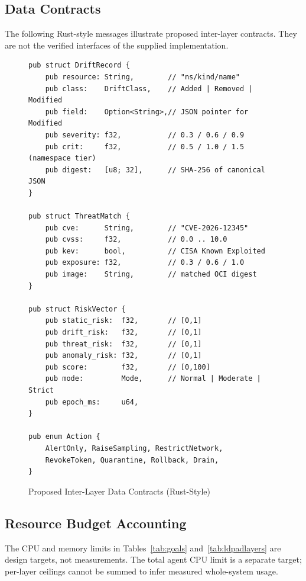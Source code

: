 \documentclass{ieeeaccess}
\begin{document}
\subsection{Data Contracts}
\label{subsec:contracts}

The following Rust-style messages illustrate proposed inter-layer contracts. They are not the verified interfaces of the supplied implementation.

\begin{figure}[t]
\caption{Proposed Inter-Layer Data Contracts (Rust-Style)}
\label{fig:contracts}
\begin{verbatim}
pub struct DriftRecord {
    pub resource: String,        // "ns/kind/name"
    pub class:    DriftClass,    // Added | Removed | Modified
    pub field:    Option<String>,// JSON pointer for Modified
    pub severity: f32,           // 0.3 / 0.6 / 0.9
    pub crit:     f32,           // 0.5 / 1.0 / 1.5 (namespace tier)
    pub digest:   [u8; 32],      // SHA-256 of canonical JSON
}

pub struct ThreatMatch {
    pub cve:      String,        // "CVE-2026-12345"
    pub cvss:     f32,           // 0.0 .. 10.0
    pub kev:      bool,          // CISA Known Exploited
    pub exposure: f32,           // 0.3 / 0.6 / 1.0
    pub image:    String,        // matched OCI digest
}

pub struct RiskVector {
    pub static_risk:  f32,       // [0,1]
    pub drift_risk:   f32,       // [0,1]
    pub threat_risk:  f32,       // [0,1]
    pub anomaly_risk: f32,       // [0,1]
    pub score:        f32,       // [0,100]
    pub mode:         Mode,      // Normal | Moderate | Strict
    pub epoch_ms:     u64,
}

pub enum Action {
    AlertOnly, RaiseSampling, RestrictNetwork,
    RevokeToken, Quarantine, Rollback, Drain,
}
\end{verbatim}
\end{figure}

\subsection{Resource Budget Accounting}
\label{subsec:budget}

The CPU and memory limits in Tables~\ref{tab:goals} and~\ref{tab:ldpadlayers} are design targets, not measurements. The total agent CPU limit is a separate target; per-layer ceilings cannot be summed to infer measured whole-system usage.
\end{document}
